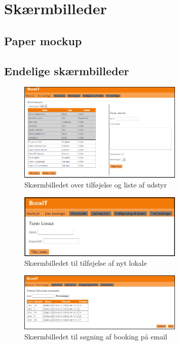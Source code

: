 \chapter{Skærmbilleder}
\label{App_GUI}

\section{Paper mockup}
\label{App_GUI_paper}

\section{Endelige skærmbilleder}
\label{App_GUI_final}

\begin{figure}[h!]
  \centering
    \includegraphics[width=0.7\textwidth]{Appendix/GUI-Prototype/DigitalMockup/UdstyrsListe}
  \caption{Skærmbilledet over tilføjelse og liste af udstyr}
\label{App_GUI_final_UdstyrsListe}
\end{figure}

\begin{figure}[h!]
  \centering
    \includegraphics[width=0.7\textwidth]{Appendix/GUI-Prototype/DigitalMockup/AddRoom}
  \caption{Skærmbilledet til tilføjelse af nyt lokale}
\label{App_GUI_final_AddRoom}
\end{figure}

\begin{figure}[h!]
  \centering
    \includegraphics[width=0.7\textwidth]{Appendix/GUI-Prototype/DigitalMockup/SpecifikBookingListe}
  \caption{Skærmbilledet til søgning af booking på email}
\label{App_GUI_final_SpecifikBookingListe}
\end{figure}

